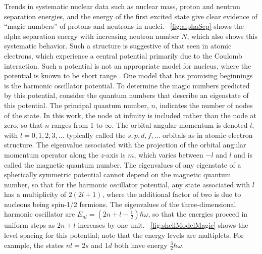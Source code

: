Trends in systematic nuclear data such as nuclear mass, proton and neutron separation energies, and the energy of the first excited state give clear evidence of ``magic numbers'' of protons and neutrons in nuclei.  {\fig}~\ref{fig:alphaSep} shows the alpha separation energy with increasing neutron number $N$, which also shows this systematic behavior.  Such a structure is suggestive of that seen in atomic electrons, which experience a central potential primarily due to the Coulomb interaction.  Such a potential is not an appropriate model for nucleus, where the potential is known to be short range \citep{Casten}.  One model that has promising beginnings is the harmonic oscillator potential.  To determine the magic numbers predicted by this potential, consider the quantum numbers that describe an eigenstate of this potential.  The principal quantum number, $n$, indicates the number of nodes of the state.  In this work, the node at infinity is included rather than the node at zero, so that $n$ ranges from 1 to $\infty$.  The orbital angular momentum is denoted $l$, with $l = 0, 1, 2, 3, ...$ typically called the $s, p, d, f, ...$ orbitals as in atomic electron structure.  The eigenvalue associated with the projection of the orbital angular momentum operator along the $z$-axis is $m$, which varies between $-l$ and $l$ and is called the magnetic quantum number.  The eigenvalues of any eigenstate of a spherically symmetric potential cannot depend on the magnetic quantum number, so that for the harmonic oscillator potential, any state associated with $l$ has a multiplicity of $2(2l+1)$, where the additional factor of two is due to nucleons being spin-1/2 fermions.  The eigenvalues of the three-dimensional harmonic oscillator are $E_{nl} = (2n+l-\frac{1}{2})\hbar\omega$, so that the energies proceed in uniform steps as $2n+l$ increases by one unit.  {\fig}~\ref{fig:shellModelMagic} shows the level spacing for this potential; note that the energy levels are multiplets.  For example, the states $nl = 2s$ and $1d$ both have energy $\frac{3}{2}\hbar\omega$.  

